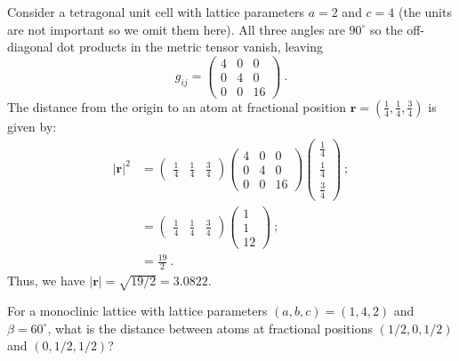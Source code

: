 \begin{example} 
Consider a tetragonal unit cell with lattice parameters $a=2$ and $c=4$ (the units are not important so we omit them here).  All three angles are $90^{\circ}$ so the off-diagonal dot products in the metric tensor vanish, leaving
\[
	g_{ij} = \left(\begin{array}{ccc}
			4 & 0 & 0\\
			0 & 4 & 0\\
			0 & 0 & 16\end{array}\right) \ .
\]
The distance from the origin to an atom at fractional position $\mathbf{r}=(\frac{1}{4},\frac{1}{4},\frac{3}{4})$ is given by:\begin{align*}
	\vert\mathbf{r}\vert^2 &= \left(\begin{array}{ccc}\frac{1}{4} & \frac{1}{4} & \frac{3}{4}\end{array}\right)
			\left(\begin{array}{ccc}
			4 & 0 & 0\\
			0 & 4 & 0\\
			0 & 0 & 16\end{array}\right)
			\left(\begin{array}{c}\frac{1}{4} \\ \frac{1}{4} \\ \frac{3}{4}\end{array}\right)\ ; \\
			&=  \left(\begin{array}{ccc}\frac{1}{4} & \frac{1}{4} & \frac{3}{4}\end{array}\right)
			\left(\begin{array}{c}1 \\ 1 \\ 12\end{array}\right)\ ; \\
			&= \frac{19}{2}\ .
\end{align*}
Thus, we have $\vert\mathbf{r}\vert = \sqrt{19/2} = 3.0822$.
\end{example}

\begin{exercise}
For a monoclinic lattice with lattice parameters $(a,b,c) = (1, 4, 2)$ and $\beta=60^{\circ}$, what is the distance between atoms at fractional positions $(1/2,0,1/2)$ and $(0,1/2,1/2)$?
\end{exercise}

